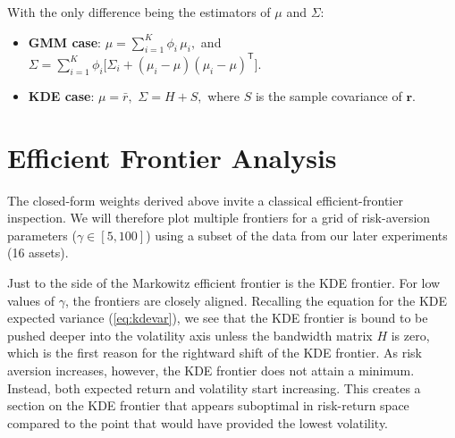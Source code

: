 With the only difference being the estimators of $\mu$ and $\Sigma$:
\begin{itemize}
\item \textbf{GMM case}: $\mu=\sum_{i=1}^K\phi_i\,\mu_i,$ and $\Sigma=\sum_{i=1}^K\phi_i\bigl[\Sigma_i+(\mu_i-\mu)(\mu_i-\mu)^{\mathsf{T}}\bigr].$
\item \textbf{KDE case}: $\mu=\bar r,$ $\Sigma=H + S,$ where $S$ is the sample covariance of $\mathbf{r}$.
\end{itemize}

\section{Efficient Frontier Analysis}
\label{sec:frontier}
The closed-form weights derived above invite a classical efficient-frontier inspection. We will therefore plot multiple frontiers for a grid of risk-aversion parameters ($\gamma \in[5,100]$) using a subset of the data from our later experiments (16 assets).

Just to the side of the Markowitz efficient frontier is the KDE frontier. For low values of $\gamma$, the frontiers are closely aligned. Recalling the equation for the KDE expected variance (\ref{eq:kdevar}), we see that the KDE frontier is bound to be pushed deeper into the volatility axis unless the bandwidth matrix $H$ is zero, which is the first reason for the rightward shift of the KDE frontier. As risk aversion increases, however, the KDE frontier does not attain a minimum. Instead, both expected return and volatility start increasing. This creates a section on the KDE frontier that appears suboptimal in risk-return space compared to the point that would have provided the lowest volatility.

